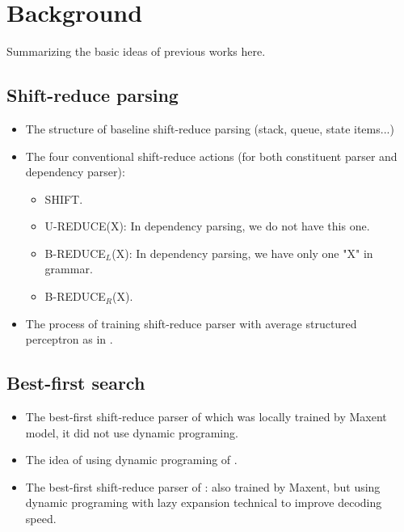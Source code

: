 \section {Background}
	Summarizing the basic ideas of previous works here.
\subsection{Shift-reduce parsing}
	\begin{itemize}
		\item The structure of baseline shift-reduce parsing (stack, queue, state items...)
		\item The four conventional shift-reduce actions (for both constituent parser and dependency parser):
		\begin{itemize}
			\item SHIFT.
			\item U-REDUCE(X): In dependency parsing, we do not have this one.
			\item B-REDUCE$_L$(X): In dependency parsing, we have only one "X" in grammar.
			\item B-REDUCE$_R$(X).
		\end{itemize}
		\item The process of training shift-reduce parser with average structured perceptron as in \cite{2004Collins}.
	\end{itemize}
\subsection{Best-first search}
	\begin{itemize}
		\item The best-first shift-reduce parser of \cite{2006Sagae} which was locally trained by Maxent model, it did not use dynamic programing.
		\item The idea of using dynamic programing of \cite{2010Huang}.
		\item The best-first shift-reduce parser of \cite{2013Zhao}: also trained by Maxent, but using dynamic programing with lazy expansion technical to improve decoding speed.
	\end{itemize}